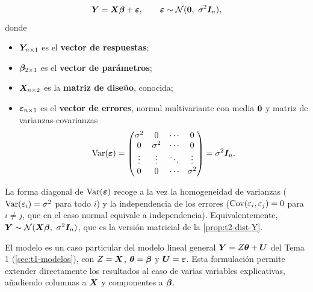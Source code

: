 \begin{definicion}
  \[
    \vect{Y} = \vect{X}\vect{\beta}+\vect{\varepsilon},
    \qquad \vect{\varepsilon}\sim\Normal(\vect{0},\ \sigma^2\vect{I}_n),
  \]
  donde
  \begin{itemize}
    \item $\bm{Y}_{n\times1}$ es el \textbf{vector de respuestas};
    \item $\bm{\beta}_{2\times1}$ es el \textbf{vector de parámetros};
    \item $\bm{X}_{n\times2}$ es la \textbf{matriz de diseño}, conocida;
    \item $\bm{\varepsilon}_{n\times1}$ es el \textbf{vector de errores}, normal multivariante con
      media $\bm{0}$ y matriz de varianzas-covarianzas
      \[
        \operatorname{Var}(\bm{\varepsilon}) =
        \begin{pmatrix}
          \sigma^2 & 0 & \cdots & 0\\
          0 & \sigma^2 & \cdots & 0\\
          \vdots & \vdots & \ddots & \vdots\\
          0 & 0 & \cdots & \sigma^2
        \end{pmatrix}
        = \sigma^2\bm{I}_n .
      \]
  \end{itemize}
\end{definicion}

La forma diagonal de $\operatorname{Var}(\bm{\varepsilon})$ recoge a la vez la homogeneidad de varianzas
($\operatorname{Var}(\varepsilon_i)=\sigma^2$ para todo $i$) y la independencia de los errores
($\operatorname{Cov}(\varepsilon_i,\varepsilon_j)=0$ para $i\neq j$, que en el caso normal equivale a
independencia). Equivalentemente, $\vect{Y}\sim\Normal(\vect{X}\vect{\beta},\ \sigma^2\vect{I}_n)$,
que es la versión matricial de la \cref{prop:t2-dist-Y}.

El modelo es un caso particular del modelo lineal general $\bm{Y}=Z\bm{\theta}+\bm{U}$ del
Tema 1 (\cref{sec:t1-modelos}), con $Z=\bm{X}$, $\bm{\theta}=\bm{\beta}$ y
$\bm{U}=\bm{\varepsilon}$. Esta formulación permite extender directamente los resultados al
caso de varias variables explicativas, añadiendo columnas a $\bm{X}$ y componentes a
$\bm{\beta}$.
